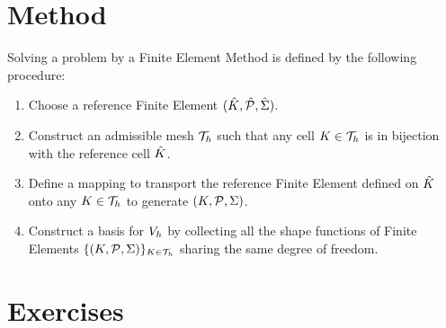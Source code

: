 
\section{Method}

\begin{lgrthm}\label{alg:fem}

Solving a problem by a Finite Element Method is defined by the following procedure:
\begin{enumerate}
\item Choose a reference Finite Element ${({\hat {{K}}},{\hat {{\mathcal P}}}, {\hat{{\Sigma}}})}$.
\item Construct an admissible mesh ${\mathcal T}_h$ such that any cell ${K} \in {\mathcal T}_h$ is in bijection with the reference cell ${\hat {{K}}}$.
\item Define a mapping to transport the reference Finite Element defined on ${\hat {{K}}}$ onto any ${K} \in {\mathcal T}_h$ to generate ${({K},{\mathcal P}, {\Sigma})}$.
\item Construct a basis for ${{V}}_h$ by collecting all the shape functions of Finite Elements $\lbrace {({K},{\mathcal P}, {\Sigma})} \rbrace_{{K} \in {\mathcal T}_h}$ sharing the same degree of freedom.

\end{enumerate}
\end{lgrthm}

\newpage

\section{Exercises}

